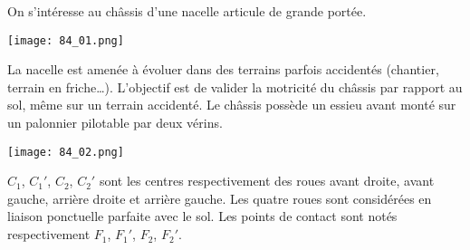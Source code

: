 \normaltrue \difficilefalse \tdifficilefalse
\correctionfalse

\setcounter{question}{0}%


\ifcorrection
\else
{}
\fi


\ifprof
\else
On s'intéresse au châssis d'une nacelle articule de grande portée.

\begin{marginfigure}
\centering
\texttt{[image: 84\_01.png]}
\end{marginfigure} 

La nacelle est amenée à évoluer dans des terrains parfois accidentés (chantier, terrain en friche…).
L’objectif est de valider la motricité du châssis par rapport au sol, même sur un terrain accidenté. 
Le châssis possède un essieu avant monté sur un palonnier pilotable par deux vérins.


\begin{marginfigure}
\centering
\texttt{[image: 84\_02.png]}
\end{marginfigure} 


$C_1$, $C_1'$, $C_2$, $C_2'$ sont les centres respectivement des roues avant droite, avant gauche, arrière droite 
et arrière gauche. Les quatre roues sont considérées en liaison ponctuelle parfaite avec le sol. Les 
points de contact sont notés respectivement $F_1$, $F_1'$, $F_2$, $F_2'$.

\fi





